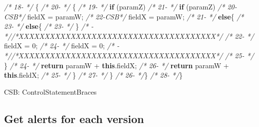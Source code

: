 \documentclass[
]{article}
\newenvironment{Shaded}{\begin{snugshade}}{\end{snugshade}}
\newcommand{\CommentTok}[1]{\textcolor[rgb]{0.56,0.35,0.01}{\textit{#1}}}
\newcommand{\DecValTok}[1]{\textcolor[rgb]{0.00,0.00,0.81}{#1}}
\newcommand{\FunctionTok}[1]{\textcolor[rgb]{0.00,0.00,0.00}{#1}}
\newcommand{\KeywordTok}[1]{\textcolor[rgb]{0.13,0.29,0.53}{\textbf{#1}}}
\newcommand{\NormalTok}[1]{#1}
\begin{document}
\begin{Shaded}
\begin{Highlighting}[]
\CommentTok{/* 18-   */}\NormalTok{    \{                                                    }\CommentTok{/* 20-   */}\NormalTok{    \{                                                    }
\CommentTok{/* 19-   */}        \KeywordTok{if}\NormalTok{ (paramZ)                                      }\CommentTok{/* 21-   */}        \KeywordTok{if}\NormalTok{ (paramZ)                                      }
\CommentTok{/* 20-CSB*/}\NormalTok{            fieldX = paramW;                             }\CommentTok{/* 22-CSB*/}\NormalTok{            fieldX = paramW;                             }
\CommentTok{/* 21-   */}        \KeywordTok{else}\NormalTok{\{                                            }\CommentTok{/* 23-   */}        \KeywordTok{else}\NormalTok{\{                                            }
\CommentTok{/* 23-   */}\NormalTok{     \}                                                        }\CommentTok{/*   -   *//*XXXXXXXXXXXXXXXXXXXXXXXXXXXXXXXXXXXXXX*/}               
\CommentTok{/* 22-   */}\NormalTok{            fieldX = }\DecValTok{0}\NormalTok{;                                  }\CommentTok{/* 24-   */}\NormalTok{            fieldX = }\DecValTok{0}\NormalTok{;                                  }
\CommentTok{/*   -   *//*XXXXXXXXXXXXXXXXXXXXXXXXXXXXXXXXXXXXXX*/}               \CommentTok{/* 25-   */}\NormalTok{        \}                                                }
\CommentTok{/* 24-   */}        \KeywordTok{return}\NormalTok{ paramW + }\KeywordTok{this}\NormalTok{.}\FunctionTok{fieldX}\NormalTok{;                     }\CommentTok{/* 26-   */}        \KeywordTok{return}\NormalTok{ paramW + }\KeywordTok{this}\NormalTok{.}\FunctionTok{fieldX}\NormalTok{;                     }
\CommentTok{/* 25-   */}\NormalTok{     \}                                                   }\CommentTok{/* 27-   */}\NormalTok{     \}                                                   }
\CommentTok{/* 26-   */}\NormalTok{\}                                                        }\CommentTok{/* 28-   */}\NormalTok{\}                                                        }


\NormalTok{CSB: ControlStatementBraces}
\end{Highlighting}
\end{Shaded}

\normalsize

\subsection{Get alerts for each version}
\end{document}
